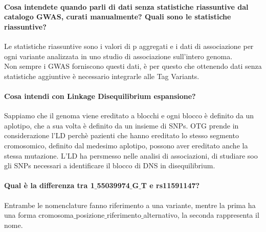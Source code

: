 \documentclass{article}
\begin{document}
\paragraph{Cosa intendete quando parli di dati senza statistiche riassuntive dal catalogo GWAS, curati manualmente? Quali sono le statistiche riassuntive?}
Le statistiche riassuntive sono i valori di p aggregati e i dati di associazione per ogni variante analizzata in uno studio di associazione sull’intero genoma.\\
Non sempre i GWAS forniscono questi dati, è per questo che ottenendo dati senza statistiche aggiuntive è necessario integrarle alle Tag Variants.
\paragraph{Cosa intendi con Linkage Disequilibrium espansione?}
Sappiamo che il genoma viene ereditato a blocchi e ogni blocco è definito da un aplotipo, che a sua volta è definito da un insieme di SNPs. OTG prende in considerazione l'LD perchè pazienti che hanno ereditato lo stesso segmento cromosomico, definito dal medesimo aplotipo, possono aver ereditato anche la stessa mutazione. L'LD ha persmesso nelle analisi di associazioni, di studiare soo gli SNPs necessari a identificare il blocco di DNS in disequilibrium. 
\paragraph{Qual è la differenza tra 1$\_$55039974$\_$G$\_$T e rs11591147?}
Entrambe le nomenclature fanno riferimento a una variante, mentre la prima ha una forma cromosoma$\_$posizione$\_$riferimento$\_$alternativo, la seconda rappresenta il nome. 
\end{document}

